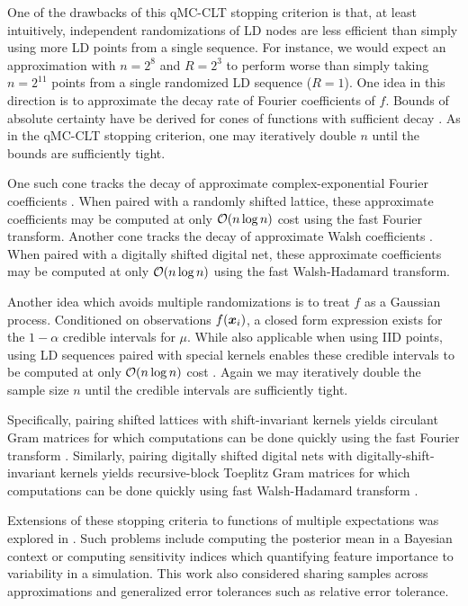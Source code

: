 \documentclass{svproc}
\begin{document}
One of the drawbacks of this qMC-CLT stopping criterion is that, at least intuitively, independent randomizations of LD nodes are less efficient than simply using more LD points from a single sequence. For instance, we would expect an approximation with $n=2^8$ and $R=2^3$ to perform worse than simply taking $n=2^{11}$ points from a single randomized LD sequence ($R=1$). One idea in this direction is to approximate the decay rate of Fourier coefficients of $f$. Bounds of absolute certainty have be derived for cones of functions with sufficient decay \cite{HicEtal17a}. As in the qMC-CLT stopping criterion, one may iteratively double $n$ until the bounds are sufficiently tight. 

One such cone tracks the decay of approximate complex-exponential Fourier coefficients \cite{JimHic16a}. When paired with a randomly shifted lattice, these approximate coefficients may be computed at only ${\mathcal{O}}(n \log n)$ cost using the fast Fourier transform. Another cone tracks the decay of approximate Walsh coefficients  \cite{HicJim16a}. When paired with a digitally shifted digital net, these approximate coefficients may be computed at only ${\mathcal{O}}(n \log n)$ using the fast Walsh-Hadamard transform. 

Another idea which avoids multiple randomizations is to treat $f$ as a Gaussian process. Conditioned on observations $f({\boldsymbol{x}}_i)$, a closed form expression exists for the $1-\alpha$ credible intervals for $\mu$. While also applicable when using IID points, using LD sequences paired with special kernels enables these credible intervals to be computed at only ${\mathcal{O}}(n \log n)$ cost \cite{rathinavel2019fast}. Again we may iteratively double the sample size $n$ until the credible intervals are sufficiently tight.

Specifically, pairing shifted lattices with shift-invariant kernels yields circulant Gram matrices for which computations can be done quickly using the fast Fourier transform \cite{RatHic19a}. Similarly, pairing digitally shifted digital nets with digitally-shift-invariant kernels yields recursive-block Toeplitz Gram matrices for which computations can be done quickly using fast Walsh-Hadamard transform \cite{JagHic22a}. 

Extensions of these stopping criteria to functions of multiple expectations was explored in \cite{sorokin2022bounding}. Such problems include computing the posterior mean in a Bayesian context or computing  sensitivity indices which  quantifying feature importance to variability in a simulation. This work also considered sharing samples across approximations and generalized error tolerances such as relative error tolerance.  
\end{document}
